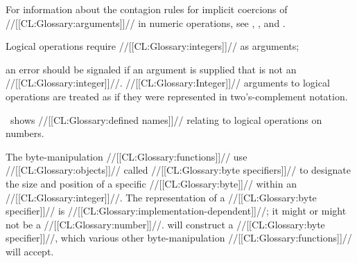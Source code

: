 
For information about the contagion rules for implicit coercions of //[[CL:Glossary:arguments]]// 
in numeric operations, see
     \secref\RuleOfFloatPrecisionContagion, 
     \secref\RuleOfFloatAndRationalContagion,
 and \secref\RuleOfComplexContagion.

\endsubsubsection%





Logical operations require //[[CL:Glossary:integers]]// as arguments;

an error  should be signaled 
if an argument is supplied that is not an //[[CL:Glossary:integer]]//.
//[[CL:Glossary:Integer]]// arguments to logical operations are treated as if
they were represented in two's-complement notation.




\Thenextfigure\ shows //[[CL:Glossary:defined names]]// relating to
logical operations on numbers.

                    
\endsubsubsubsection%



The byte-manipulation //[[CL:Glossary:functions]]// use //[[CL:Glossary:objects]]// 
called //[[CL:Glossary:byte specifiers]]// to designate the size and position
of a specific //[[CL:Glossary:byte]]// within an //[[CL:Glossary:integer]]//.
The representation of a //[[CL:Glossary:byte specifier]]// is //[[CL:Glossary:implementation-dependent]]//;
it might or might not be a //[[CL:Glossary:number]]//.
 will construct a //[[CL:Glossary:byte specifier]]//,
which various other byte-manipulation //[[CL:Glossary:functions]]// will accept.

